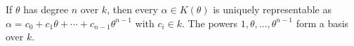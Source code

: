 If $\theta$ has degree $n$ over $k$, then every $\alpha \in K(\theta)$ is uniquely representable as $\alpha = c_0 + c_1\theta + \cdots + c_{n-1}\theta^{n-1}$ with $c_i \in k$. The powers $1,\theta,\ldots,\theta^{n-1}$ form a basis over $k$.
